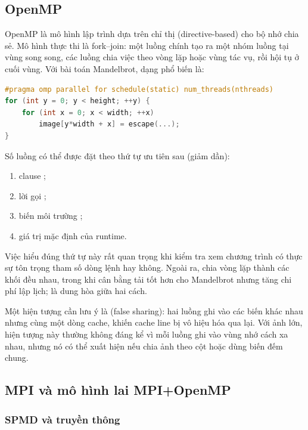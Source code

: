 \subsection{OpenMP}

OpenMP là mô hình lập trình dựa trên chỉ thị (directive-based) cho bộ nhớ chia sẻ.
Mô hình thực thi là fork--join: một luồng chính tạo ra một nhóm luồng tại vùng
song song, các luồng chia việc theo vòng lặp hoặc vùng tác vụ, rồi hội tụ ở cuối
vùng. Với bài toán Mandelbrot, dạng phổ biến là:

\begin{lstlisting}[language=C++,caption={Song song hóa vòng lặp điểm ảnh bằng OpenMP.},label={lst:omp}]
#pragma omp parallel for schedule(static) num_threads(nthreads)
for (int y = 0; y < height; ++y) {
    for (int x = 0; x < width; ++x)
        image[y*width + x] = escape(...);
}
\end{lstlisting}

Số luồng có thể được đặt theo thứ tự ưu tiên sau (giảm dần):
\begin{enumerate}
  \item clause ;
  \item lời gọi ;
  \item biến môi trường ;
  \item giá trị mặc định của runtime.
\end{enumerate}
Việc hiểu đúng thứ tự này rất quan trọng khi kiểm tra
xem chương trình có thực sự tôn trọng tham số dòng lệnh hay không. Ngoài ra,
 chia vòng lặp thành các khối đều nhau, trong khi
 cân bằng tải tốt hơn cho Mandelbrot nhưng tăng chi phí
lập lịch;  là dung hòa giữa hai cách.

Một hiện tượng cần lưu ý là  (false sharing): hai luồng ghi vào
các biến khác nhau nhưng cùng một dòng cache, khiến cache line bị vô hiệu hóa qua
lại. Với ảnh lớn, hiện tượng này thường không đáng kể vì mỗi luồng ghi vào vùng
nhớ cách xa nhau, nhưng nó có thể xuất hiện nếu chia ảnh theo cột hoặc dùng biến
đếm chung.

\subsection{MPI và mô hình lai MPI+OpenMP}

\subsubsection{SPMD và truyền thông}

